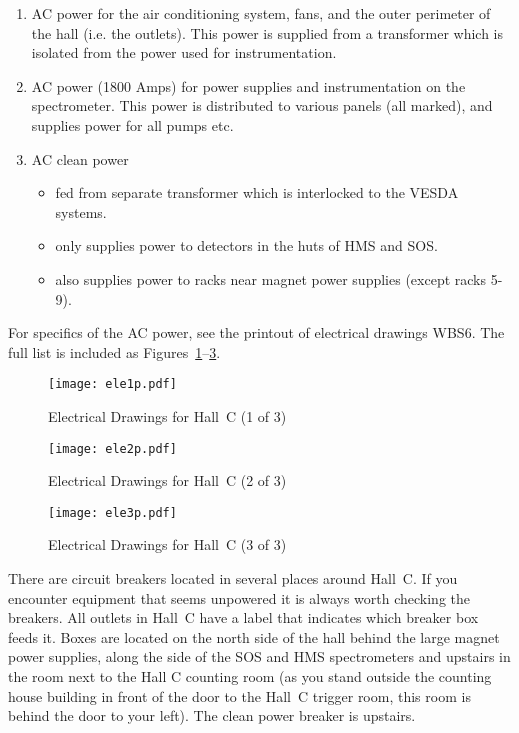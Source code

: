 {\begin{enumerate}
\item{AC power for the air conditioning system, fans, and the
outer perimeter of the hall (i.e. the outlets). This power is
supplied from a transformer which is isolated from the power
used for instrumentation.}
\item{AC power (1800 Amps) for power supplies and instrumentation
on the spectrometer. This power is distributed to various panels
(all marked), and supplies power for all pumps etc.}
\item{AC clean power
\begin{itemize}
\item{fed from separate transformer which is interlocked to the
VESDA systems.}
\item{only supplies power to detectors in the huts of HMS and SOS.}
\item{also supplies power to racks near magnet power supplies (except
racks 5-9).}
\end{itemize}}
\end{enumerate}

For specifics of the AC power, see the printout of electrical drawings
WBS6. The full list is included as  Figures~\ref{fig:elect_dwgs1}--\ref{fig:elect_dwgs3}.
\clearpage
\begin{figure}
\begin{center}
\texttt{[image: ele1p.pdf]}
\caption{Electrical Drawings for Hall~C (1 of 3)}
\label{fig:elect_dwgs1}
\end{center}
\end{figure}

\clearpage
\begin{figure}
\begin{center}
\texttt{[image: ele2p.pdf]}
\caption{Electrical Drawings for Hall~C (2 of 3)}
\label{fig:elect_dwgs2}
\end{center}
\end{figure}

\clearpage
\begin{figure}
\begin{center}
\texttt{[image: ele3p.pdf]}
\caption{Electrical Drawings for Hall~C (3 of 3)}
\label{fig:elect_dwgs3}
\end{center}
\end{figure}
\clearpage


There are circuit breakers located in several places around Hall~C.
If you encounter equipment that seems unpowered it is always worth checking the
breakers. All outlets in Hall~C  have a label that indicates which
breaker box feeds it. Boxes are located on the north side of the hall behind
the large magnet power supplies, along the side of the SOS and HMS spectrometers
and upstairs in the room next to the Hall C counting room (as you stand outside the
counting house building in front of the door to the Hall~C trigger
room, this room is behind the door to your left). The clean power
breaker is upstairs.

}
